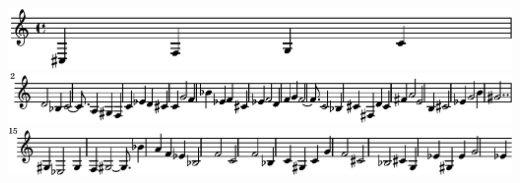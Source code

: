 \includegraphics{png-19-05-2020-11-33-40-1}%
\ifx\betweenLilyPondSystem \undefined
  \linebreak
\else
  \expandafter{}%
\fi
\includegraphics{png-19-05-2020-11-33-40-2}%
\ifx\betweenLilyPondSystem \undefined
  \linebreak
\else
  \expandafter{}%
\fi
\includegraphics{png-19-05-2020-11-33-40-3}%
